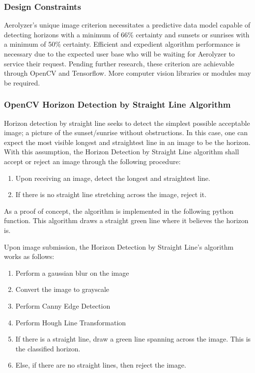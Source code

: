 \documentclass[onecolumn, draftclsnofoot,10pt, compsoc]{IEEEtran}
\begin{document}
\begin{singlespace}
		\subsubsection{Design Constraints}
			Aerolyzer’s unique image criterion necessitates a predictive data model capable of detecting horizons with a minimum of 66\% certainty and sunsets or sunrises with a minimum of 50\% certainty.
			Efficient and expedient algorithm performance is necessary due to the expected user base who will be waiting for Aerolyzer to service their request.
			Pending further research, these criterion are achievable through OpenCV and Tensorflow.
			More computer vision libraries or modules may be required.
	      
		\subsubsection{OpenCV Horizon Detection by Straight Line Algorithm}
			Horizon detection by straight line seeks to detect the simplest possible acceptable image; a picture of the sunset/sunrise without obstructions.
			In this case, one can expect the most visible longest and straightest line in an image to be the horizon.
			With this assumption, the Horizon Detection by Straight Line algorithm shall accept or reject an image through the following procedure:
			\begin{enumerate}
				\item Upon receiving an image, detect the longest and straightest line.
				\item If there is no straight line stretching across the image, reject it.
			\end{enumerate}
			As a proof of concept, the algorithm is implemented in the following python function.
			This algorithm draws a straight green line where it believes the horizon is.
			

			Upon image submission, the Horizon Detection by Straight Line’s algorithm works as follows:
				
				\begin{enumerate}
					\item Perform a gaussian blur on the image
					\item Convert the image to grayscale
					\item Perform Canny Edge Detection \cite{svm}
					\item Perform Hough Line Transformation \cite{svm}
					\item If there is a straight line, draw a green line spanning across the image.
						This is the classified horizon.
					\item Else, if there are no straight lines, then reject the image.
				\end{enumerate}



\end{singlespace}
\end{document}
